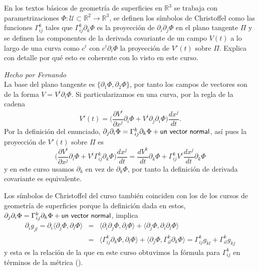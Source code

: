 \begin{problem}[8]En los textos básicos de geometría de superficies en $ℝ^3$ se trabaja con parametrizaciones $\Phi:\mathcal{U}\subset ℝ^2\longrightarrow ℝ^3$, se definen los símbolos de Christoffel como las funciones $\Gamma_{ij}^k$ tales que $\Gamma_{ij}^k\partial_k\Phi$ es la proyección de $\partial_i\partial_j\Phi$ en el plano tangente $\Pi$  y se definen las componentes de la derivada covariante de un campo $V(t)$ a lo largo de una curva como $c^i$ con $c^i\partial_i\Phi$ la proyección de  $V'(t)$ sobre $\Pi$. Explica con detalle por qué esto es coherente con lo visto en este curso.  
	
	\solution\textit{Hecho por Fernando}\\ La base del plano tangente es $\{\partial_1\Phi,\partial_2\Phi\}$, por tanto los campos de vectores son de la forma $V=V^i\partial_i\Phi$. Si particularizamos en una curva, por la regla de la cadena 
	\[
	V'(t)=
	\Big(
	\frac{\partial V^i}{\partial x^j}
	\partial_i\Phi
	+V^i\partial_j\partial_i\Phi
	\Big)
	\frac{dx^j}{dt}.
	\]
	Por la definición del enunciado, $\partial_j\partial_i\Phi=\Gamma_{ij}^k\partial_k\Phi+\text{\sf un vector normal}$, así pues la proyección de $V'(t)$ sobre $\Pi$ es
	\[
	\Big(
	\frac{\partial V^i}{\partial x^j}
	\partial_i\Phi
	+V^i\Gamma_{ij}^k\partial_k\Phi
	\Big)
	\frac{dx^j}{dt}
	=\frac{dV^k}{dt}
	\partial_k\Phi
	+\Gamma_{ij}^k
	V^i
	\frac{dx^j}{dt}
	\partial_k\Phi
	\]
	y en este curso usamos $\partial_k$ en vez de $\partial_k\Phi$, por tanto la definición de derivada covariante es equivalente.  
	
	Los símbolos de Christoffel del curso también coinciden con los de los cursos de geometría de superficies porque la definición dada en estos, $\partial_j\partial_i\Phi=\Gamma_{ij}^k\partial_k\Phi+\text{\sf un vector normal}$, implica
	\begin{eqnarray*}
		\partial_i g_{jl}
		=\partial_i\langle\partial_j\Phi, \partial_l\Phi\rangle 
		&=&
		\langle\partial_i\partial_j\Phi, \partial_l\Phi\rangle 
		+\langle\partial_j\Phi, \partial_i\partial_l\Phi\rangle 
		\\
		&=&
		\langle\Gamma_{ij}^k\partial_k\Phi, \partial_l\Phi\rangle 
		+\langle\partial_j\Phi, \Gamma_{il}^k\partial_k\Phi\rangle 
		=
		\Gamma_{ij}^kg_{kl}
		+
		\Gamma_{il}^kg_{kj}
	\end{eqnarray*}
	y esta es la relación de la que en este curso obtuvimos la fórmula para $\Gamma_{ij}^k$ en términos de la métrica ().
	
	
	
\end{problem}
